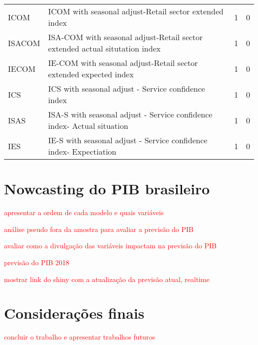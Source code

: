 \documentclass{article}
\begin{document}
\begin{landscape}
\begin{center}
\begin{longtable}{|l|l|l|l|}
ICOM & ICOM with seasonal adjust-Retail sector extended index & 1 & 0 \\
ISACOM & ISA-COM with seasonal adjust-Retail sector extended actual situtation index & 1 & 0 \\
IECOM & IE-COM with seasonal adjust-Retail sector extended expected index & 1 & 0 \\
ICS & ICS with seasonal adjust - Service confidence index & 1 & 0 \\
ISAS & ISA-S with seasonal adjust - Service confidence index- Actual situation & 1 & 0 \\
IES & IE-S with seasonal adjust - Service confidence index- Expectiation & 1 & 0 \\

\end{longtable}
\end{center}
\end{landscape}


\section{Nowcasting do PIB brasileiro}\label{nowcastingBR}

\textcolor{red}{apresentar a ordem de cada modelo e quais variáveis}

\textcolor{red}{análise pseudo fora da amostra para avaliar a previsão do PIB}

\textcolor{red}{avaliar como a divulgação das variáveis impactam na previsão do PIB}

\textcolor{red}{previsão do PIB 2018}

\textcolor{red}{mostrar link do shiny com a atualização da previsão atual, realtime}

\section{Considerações finais}\label{conclusao}

\textcolor{red}{concluir o trabalho e apresentar trabalhos futuros}



\end{document}
